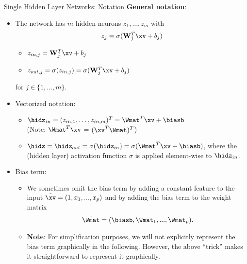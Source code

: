 \begin{vbframe}{Single Hidden Layer Networks: Notation}
  \textbf{General notation}:
  \begin{itemize}
    \vspace{4mm}
    \item The network has $m$ hidden neurons $z_1, \dots, z_m$ with
    $$ z_j = \sigma(\mathbf{W}_j^T \xv + b_j)$$
    \vspace{-0.5cm}
    \begin{itemize}
    \item $z_{in,j}  = \mathbf{W}_j^T \xv + b_j$
    \vspace{2mm}
    \item $z_{out,j} = \sigma(z_{in,j}) = \sigma(\mathbf{W}_j^T \xv + b_j)$
    \end{itemize}
    \vspace{4mm}
    for $j \in \{1,\ldots,m\}$.
    \vspace{4mm}
    \framebreak 

\item Vectorized notation:
\begin{itemize}
\item $ \hidz_{in} = (z_{in,1}, \dots, z_{in,m})^T = \Wmat^T \xv + \biasb$ \\ (Note: $\Wmat^T \xv$ = $(\xv^T \Wmat)^T$)
\item $ \hidz = \hidz_{out} = \sigma(\hidz_{in}) = \sigma(\Wmat^T \xv + \biasb)$, where the (hidden layer) activation function $\sigma$ is applied element-wise to $\hidz_{in}$.  
\end{itemize}
\item Bias term:         
\begin{itemize}
\item We sometimes omit the bias term by adding a constant feature to the input $\tilde{\xv} = (1, x_1, ..., x_p)$ and by adding the bias term to the weight matrix 
$$\tilde{\Wmat} = (\biasb, \Wmat_1, ..., \Wmat_p).$$ 
\item \textbf{Note}: For simplification purposes, we will not explicitly represent the bias term graphically in the following. However, the above \enquote{trick} makes it straightforward to represent it graphically. 
\end{itemize}
\end{itemize}
\framebreak


\end{vbframe}
